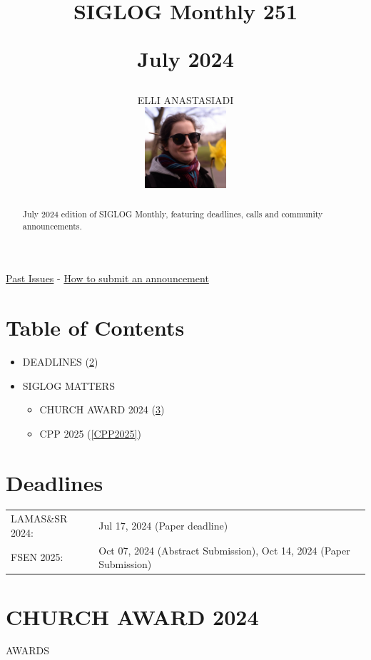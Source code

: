 \documentclass[prodmode,acmtecs]{acmsmall} %
\newcounter{colstart}
\begin{document}
\setcounter{colstart}{\thepage}

\title{{\huge\sc SIGLOG Monthly 251}

 July 2024}\author{ELLI ANASTASIADI\vspace*{-2.6cm}\begin{flushright}\includegraphics[width=30mm]{elli_anastasiadi.png}\end{flushright}}\begin{abstract}July 2024 edition of SIGLOG Monthly, featuring deadlines, calls and community announcements.
\end{abstract}


\maketitlee

\href{https://lics.siglog.org/newsletters/}{Past Issues}
 - 
\href{https://lics.siglog.org/newsletters/inst.html}{How to submit an announcement}
\section{Table of Contents}\begin{itemize}\item DEADLINES (\cref{deadlines}) 
 
\item SIGLOG MATTERS 
 
\begin{itemize}\item CHURCH AWARD 2024 (\cref{CHURCHAWARD2024})
\item CPP 2025 (\cref{CPP2025})
\end{itemize} 
\end{itemize}\section{Deadlines}\label{deadlines}\begin{tabulary}{\linewidth}{LL}LAMAS\&SR 2024:  & Jul 17, 2024 (Paper deadline) \\
FSEN 2025:  & Oct 07, 2024 (Abstract Submission), Oct 14, 2024 (Paper Submission) \\
\end{tabulary}
\section{CHURCH AWARD 2024}\label{CHURCHAWARD2024}AWARDS 
\end{document}

